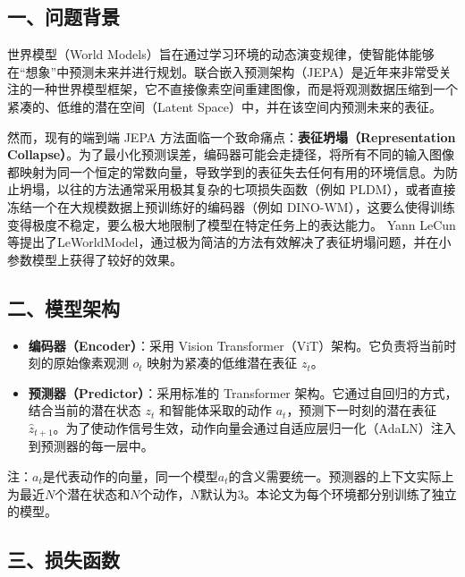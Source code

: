 \hypertarget{ux4e00ux95eeux9898ux80ccux666f-13}{%
\subsection{一、问题背景}\label{ux4e00ux95eeux9898ux80ccux666f-13}}

世界模型（World Models）旨在通过学习环境的动态演变规律，使智能体能够在``想象''中预测未来并进行规划。联合嵌入预测架构（JEPA）是近年来非常受关注的一种世界模型框架，它不直接像素空间重建图像，而是将观测数据压缩到一个紧凑的、低维的潜在空间（Latent Space）中，并在该空间内预测未来的表征。

然而，现有的端到端 JEPA 方法面临一个致命痛点：\textbf{表征坍塌（Representation Collapse）}。为了最小化预测误差，编码器可能会走捷径，将所有不同的输入图像都映射为同一个恒定的常数向量，导致学到的表征失去任何有用的环境信息。为防止坍塌，以往的方法通常采用极其复杂的七项损失函数（例如 PLDM），或者直接冻结一个在大规模数据上预训练好的编码器（例如 DINO-WM），这要么使得训练变得极度不稳定，要么极大地限制了模型在特定任务上的表达能力。
Yann LeCun等提出了LeWorldModel，通过极为简洁的方法有效解决了表征坍塌问题，并在小参数模型上获得了较好的效果。

\hypertarget{ux4e8cux6a21ux578bux67b6ux6784-4}{%
\subsection{二、模型架构}\label{ux4e8cux6a21ux578bux67b6ux6784-4}}

\begin{itemize}
\tightlist
\item
  \textbf{编码器（Encoder）}：采用 Vision Transformer（ViT）架构。它负责将当前时刻的原始像素观测 \(o_t\) 映射为紧凑的低维潜在表征 \(z_t\)。
\item
  \textbf{预测器（Predictor）}：采用标准的 Transformer 架构。它通过自回归的方式，结合当前的潜在状态 \(z_t\) 和智能体采取的动作 \(a_t\)，预测下一时刻的潜在表征 \(\hat{z}_{t+1}\)。为了使动作信号生效，动作向量会通过自适应层归一化（AdaLN）注入到预测器的每一层中。
\end{itemize}

注：\(a_t\)是代表动作的向量，同一个模型\(a_t\)的含义需要统一。预测器的上下文实际上为最近\(N\)个潜在状态和\(N\)个动作，\(N\)默认为3。本论文为每个环境都分别训练了独立的模型。

\hypertarget{ux4e09ux635fux5931ux51fdux6570-4}{%
\subsection{三、损失函数}\label{ux4e09ux635fux5931ux51fdux6570-4}}

